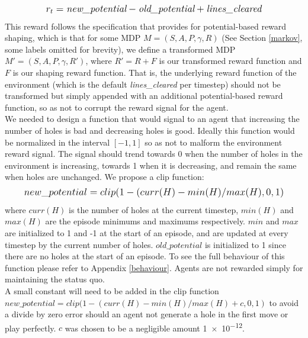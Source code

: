 \documentclass[12pt]{article}
\begin{document}
\begin{equation}
\mathlarger{
        r_t  = \textit{new\_potential}-\textit{old\_potential} + \textit{lines\_cleared}
    }
\end{equation}
This reward follows the specification that \textcite{ng1999policy} provides for potential-based reward shaping, which is that for some MDP $M = (S,A,P,\gamma,R)$ (See Section \ref{markov}, some labels omitted for brevity), we define a transformed MDP $M' = (S,A,P,\gamma,R')$, where $R' = R + F$ is our transformed reward function and $F$ is our shaping reward function. That is, the underlying reward function of the environment (which is the default \textit{lines\_cleared} per timestep) should not be transformed but simply appended with an additional potential-based reward function, so as not to corrupt the reward signal for the agent. \\\newline
We needed to design a function that would signal to an agent that increasing the number of holes is bad and decreasing holes is good. Ideally this function would be normalized in the interval $[-1,1]$ so as not to malform the environment reward signal. The signal should trend towards 0 when the number of holes in the environment is increasing, towards 1 when it is decreasing, and remain the same when holes are unchanged. We propose a clip function:
\begin{equation}
\mathlarger{
        new\_potential = clip(1-(curr(H)-min(H)/max(H),0,1)
    }
\end{equation}
where $curr(H)$ is the number of holes at the current timestep, $min(H)$ and $max(H)$ are the episode minimums and maximums respectively. $min$ and $max$ are initialized to 1 and -1 at the start of an episode, and are updated at every timestep by the current number of holes. $old\_potential$ is initialized to 1 since there are no holes at the start of an episode. To see the full behaviour of this function please refer to Appendix \ref{behaviour}. Agents are not rewarded simply for maintaining the status quo. \\\newline A small constant will need to be added in the clip function $new\_potential = clip(1-(curr(H)-min(H)/max(H)+c,0,1)$ to avoid a divide by zero error should an agent not generate a hole in the first move or play perfectly. $c$ was chosen to be a negligible amount \num{1e-12}.
\end{document}
